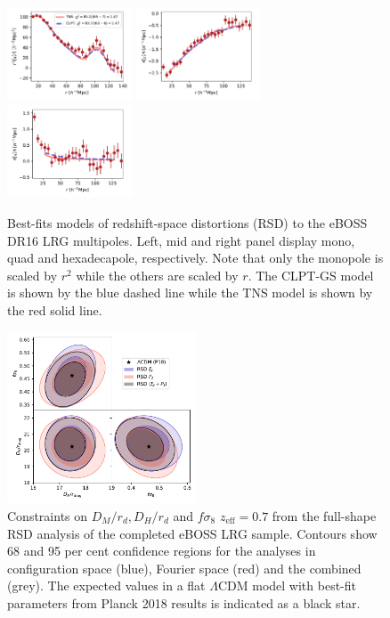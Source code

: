 \begin{figure}
    \centering
    \includegraphics[width=0.33\textwidth]{fig/galaxies/DR16_LRG_RSD_v7_2_bestfits_mono.pdf}
    \includegraphics[width=0.33\textwidth]{fig/galaxies/DR16_LRG_RSD_v7_2_bestfits_quad_scaler1.pdf}
    \includegraphics[width=0.33\textwidth]{fig/galaxies/DR16_LRG_RSD_v7_2_bestfits_hexa_scaler1.pdf}
    \caption{Best-fits models of redshift-space distortions (RSD) to the 
    eBOSS DR16 LRG multipoles. 
    Left, mid and right panel display mono, quad and hexadecapole, respectively. 
    Note that only the monopole is scaled by $r^2$ while the others are scaled by $r$.
    The CLPT-GS model is shown by the blue dashed line while the TNS
    model is shown by the red solid line. 
    }
    \label{fig:eboss_dr16_lrg_rsd_bestfit}
\end{figure}


\begin{figure}
    \centering
    \includegraphics[width=0.5\textwidth]{fig/galaxies/DR16_LRG_consensus_rsd_planck.pdf}
    \caption{Constraints on $D_M/r_d, D_H/r_d$ and $f\sigma_8$ $z_\text{eff} = 0.7$ 
    from the full-shape 
    RSD analysis of the completed eBOSS LRG sample.
    Contours show 68 and 95 per cent confidence regions for the analyses in 
    configuration space (blue), Fourier space (red) 
    and the combined (grey). 
    The expected values in a flat $\Lambda$CDM 
    model with best-fit parameters from Planck 2018 results 
    is indicated as a black star.}
    \label{fig:eboss_dr16_lrg_rsd_contours}
\end{figure}



